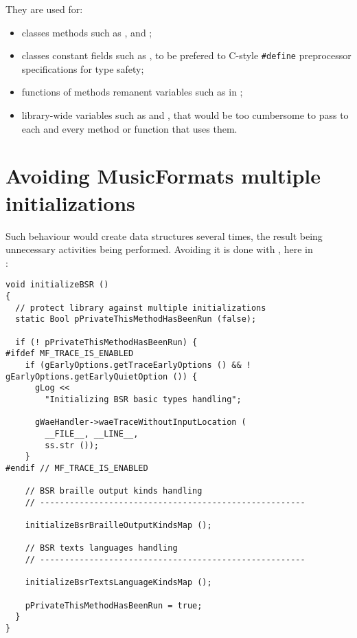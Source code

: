 They are used for:
\begin{itemize}
\item classes methods such as ,  and ;

\item classes constant fields such as , to be prefered to C-style {\tt \#define} preprocessor specifications for type safety;

\item functions of methods remanent variables such as  in ;

\item library-wide variables such as  and , that would be too cumbersome to pass to each and every method or function that uses them.
\end{itemize}


\section{Avoiding MusicFormats multiple initializations}

Such behaviour would create data structures several times, the result being unnecessary activities being performed. Avoiding it is done with , here in \\
:
\begin{lstlisting}[language=CPlusPlus]
void initializeBSR ()
{
  // protect library against multiple initializations
  static Bool pPrivateThisMethodHasBeenRun (false);

  if (! pPrivateThisMethodHasBeenRun) {
#ifdef MF_TRACE_IS_ENABLED
    if (gEarlyOptions.getTraceEarlyOptions () && ! gEarlyOptions.getEarlyQuietOption ()) {
      gLog <<
        "Initializing BSR basic types handling";

      gWaeHandler->waeTraceWithoutInputLocation (
        __FILE__, __LINE__,
        ss.str ());
    }
#endif // MF_TRACE_IS_ENABLED

    // BSR braille output kinds handling
    // ------------------------------------------------------

    initializeBsrBrailleOutputKindsMap ();

    // BSR texts languages handling
    // ------------------------------------------------------

    initializeBsrTextsLanguageKindsMap ();

    pPrivateThisMethodHasBeenRun = true;
  }
}
\end{lstlisting}


